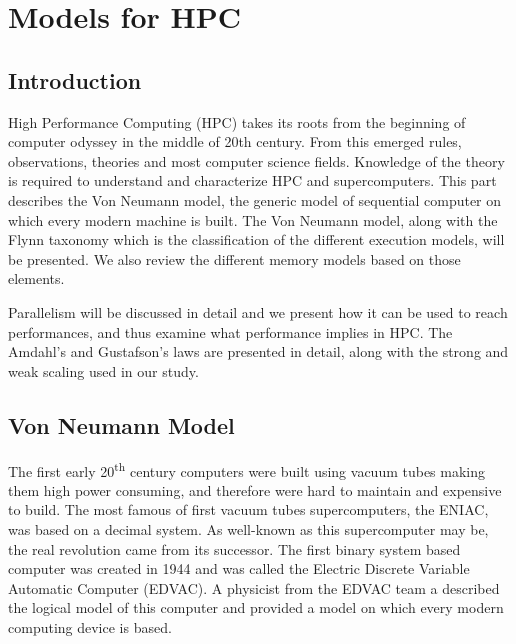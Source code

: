 
\chapter{Models for HPC}

\section{Introduction}

High Performance Computing (HPC) takes its roots from the beginning of computer odyssey in the middle of 20th century.
From this emerged rules, observations, theories and most computer science fields.
Knowledge of the theory is required to understand and characterize HPC and supercomputers.  
This part describes the Von Neumann model, the generic model of sequential computer on which every modern machine is built.
The Von Neumann model, along with the Flynn taxonomy which is the classification of the different execution models, will be presented. 
We also review the different memory models based on those elements. 

Parallelism will be discussed in detail and we present how it can be used to reach performances, and thus examine what performance implies in HPC.
The Amdahl's and Gustafson's laws are presented in detail, along with the strong and weak scaling used in our study. 

\section{Von Neumann Model}
The first early 20\textsuperscript{th} century computers were built using vacuum tubes making them high power consuming, and therefore were hard to maintain and expensive to build.
The most famous of first vacuum tubes supercomputers, the ENIAC, was based on a decimal system.
As well-known as this supercomputer may be, the real revolution came from its successor.
The first binary system based computer was created in 1944 and was called the Electric Discrete Variable Automatic Computer (EDVAC). 
A physicist from the EDVAC team a described the logical model of this computer and provided a model on which every modern computing device is based. 

